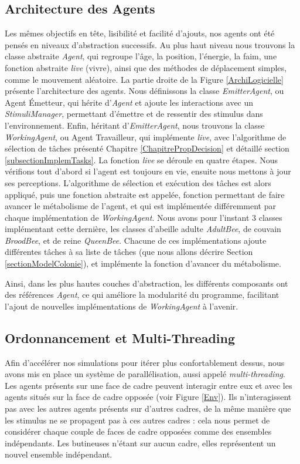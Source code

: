 			\subsection{Architecture des Agents}
			Les mêmes objectifs en tête, lisibilité et facilité d'ajouts, nos agents ont été pensés en niveaux d'abstraction successifs. Au plus haut niveau nous trouvons la classe abstraite \textit{Agent}, qui regroupe l'âge, la position, l'énergie, la faim, une fonction abstraite \textit{live} (vivre), ainsi que des méthodes de déplacement simples, comme le mouvement aléatoire. La partie droite de la Figure \ref{ArchiLogicielle} présente l'architecture des agents. Nous définissons la classe \textit{EmitterAgent}, ou Agent Émetteur, qui hérite d'\textit{Agent} et ajoute les interactions avec un \textit{StimuliManager}, permettant d'émettre et de ressentir des stimulus dans l'environnement. Enfin, héritant d'\textit{EmitterAgent}, nous trouvons la classe \textit{WorkingAgent}, ou Agent Travailleur, qui implémente \textit{live}, avec l'algorithme de sélection de tâches présenté Chapitre \ref{ChapitrePropDecision} et détaillé section \ref{subsectionImplemTasks}. La fonction \textit{live} se déroule en quatre étapes. Nous vérifions tout d'abord si l'agent est toujours en vie, ensuite nous mettons à jour ses perceptions. L'algorithme de sélection et exécution des tâches est alors appliqué, puis une fonction abstraite est appelée, fonction permettant de faire avancer le métabolisme de l'agent, et qui est implémentée différemment par chaque implémentation de \textit{WorkingAgent}. Nous avons pour l'instant 3 classes implémentant cette dernière, les classes d'abeille adulte \textit{AdultBee}, de couvain \textit{BroodBee}, et de reine \textit{QueenBee}. Chacune de ces implémentations ajoute différentes tâches à sa liste de tâches (que nous allons décrire Section \ref{sectionModelColonie}), et implémente la fonction d'avancer du métabolisme.
			
			Ainsi, dans les plus hautes couches d'abstraction, les différents composants ont des références \textit{Agent}, ce qui améliore la modularité du programme, facilitant l'ajout de nouvelles implémentations de \textit{WorkingAgent} à l'avenir. 
			
			\subsection{Ordonnancement et Multi-Threading}
			Afin d'accélérer nos simulations pour itérer plus confortablement dessus, nous avons mis en place un système de parallélisation, aussi appelé \textit{multi-threading}. Les agents présents sur une face de cadre peuvent interagir entre eux et avec les agents situés sur la face de cadre opposée (voir Figure \ref{Env}). Ils n'interagissent pas avec les autres agents présents sur d'autres cadres, de la même manière que les stimulus ne se propagent pas à ces autres cadres : cela nous permet de considérer chaque couple de faces de cadre opposées comme des ensembles indépendants. Les butineuses n'étant sur aucun cadre, elles représentent un nouvel ensemble indépendant.
			
